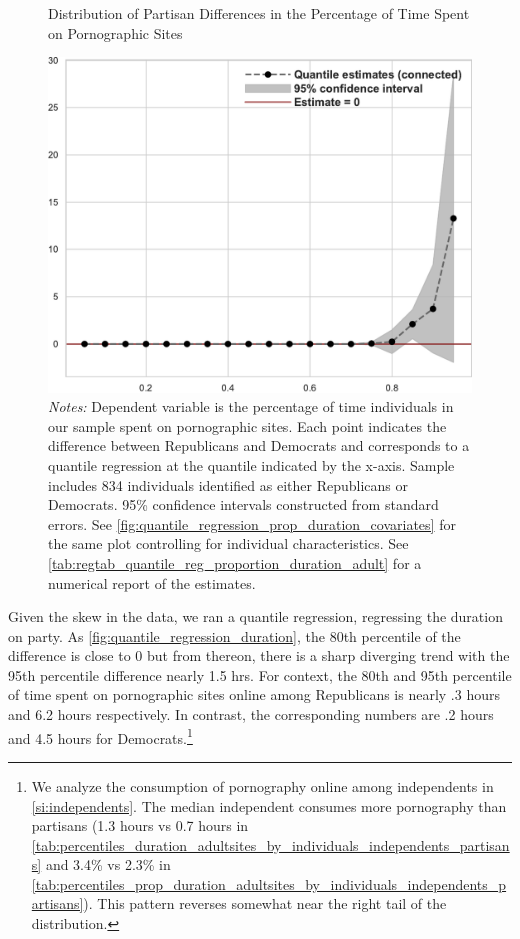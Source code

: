\documentclass[12pt, letterpaper]{article}
\begin{document}
\begin{figure}[t]
	\centering
	\caption{Distribution of Partisan Differences in the Percentage of Time Spent on Pornographic Sites}
	\includegraphics[width=.7\linewidth]{../figs/quantile_reg_proportion_duration_adult.pdf}
	\caption*{\footnotesize \emph{Notes:} 
		Dependent variable is the percentage of time individuals in our sample spent on pornographic sites.
		Each point indicates the difference between Republicans and Democrats and corresponds to a quantile regression at the quantile indicated by the x-axis.
		Sample includes 834 individuals identified as either Republicans or Democrats.
		95\% confidence intervals constructed from standard errors.
		See \cref{fig:quantile_regression_prop_duration_covariates} for the same plot controlling for individual characteristics.
		See \cref{tab:regtab_quantile_reg_proportion_duration_adult} for a numerical report of the estimates.
	}
	\label{fig:quantile_regression_prop_duration}
\end{figure}

Given the skew in the data, we ran a quantile regression, regressing the duration on party. As \cref{fig:quantile_regression_duration}, the 80th percentile of the difference is close to 0 but from thereon, there is a sharp diverging trend with the 95th percentile difference nearly 1.5 hrs. For context, the 80th and 95th percentile of time spent on pornographic sites online among Republicans is nearly .3 hours and 6.2 hours respectively. In contrast, the corresponding numbers are .2 hours and 4.5 hours for Democrats.\footnote{
We analyze the consumption of pornography online among independents in \cref{si:independents}. The median independent consumes more pornography than partisans (1.3 hours vs 0.7 hours in \cref{tab:percentiles_duration_adultsites_by_individuals_independents_partisans} and 3.4\% vs 2.3\% in \cref{tab:percentiles_prop_duration_adultsites_by_individuals_independents_partisans}). This pattern reverses somewhat near the right tail of the distribution.}
\end{document}
